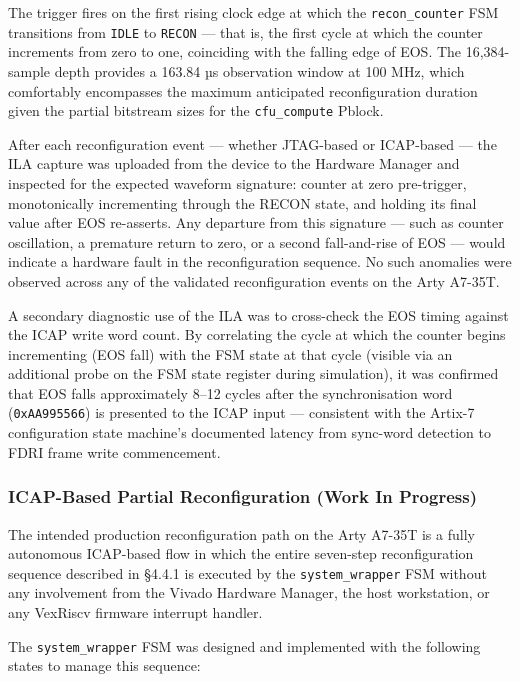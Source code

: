 The trigger fires on the first rising clock edge at which the \texttt{recon\_counter} FSM transitions from \texttt{IDLE} to \texttt{RECON} — that is, the first cycle at which the counter increments from zero to one, coinciding with the falling edge of EOS. The 16,384-sample depth provides a 163.84 µs observation window at 100 MHz, which comfortably encompasses the maximum anticipated reconfiguration duration given the partial bitstream sizes for the \texttt{cfu\_compute} Pblock.

After each reconfiguration event — whether JTAG-based or ICAP-based — the ILA capture was uploaded from the device to the Hardware Manager and inspected for the expected waveform signature: counter at zero pre-trigger, monotonically incrementing through the RECON state, and holding its final value after EOS re-asserts. Any departure from this signature — such as counter oscillation, a premature return to zero, or a second fall-and-rise of EOS — would indicate a hardware fault in the reconfiguration sequence. No such anomalies were observed across any of the validated reconfiguration events on the Arty A7-35T.

A secondary diagnostic use of the ILA was to cross-check the EOS timing against the ICAP write word count. By correlating the cycle at which the counter begins incrementing (EOS fall) with the FSM state at that cycle (visible via an additional probe on the FSM state register during simulation), it was confirmed that EOS falls approximately 8–12 cycles after the synchronisation word (\texttt{0xAA995566}) is presented to the ICAP input — consistent with the Artix-7 configuration state machine's documented latency from sync-word detection to FDRI frame write commencement.

\subsubsection{ICAP-Based Partial Reconfiguration (Work In Progress)}

The intended production reconfiguration path on the Arty A7-35T is a fully autonomous ICAP-based flow in which the entire seven-step reconfiguration sequence described in §4.4.1 is executed by the \texttt{system\_wrapper} FSM without any involvement from the Vivado Hardware Manager, the host workstation, or any VexRiscv firmware interrupt handler.

The \texttt{system\_wrapper} FSM was designed and implemented with the following states to manage this sequence:

